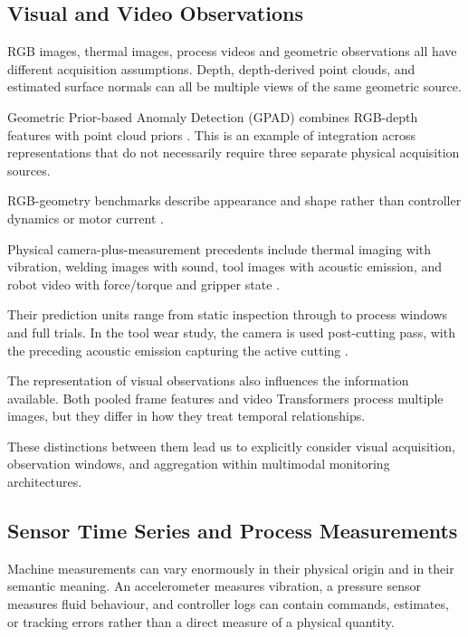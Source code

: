 \subsection{Visual and Video Observations}

RGB images, thermal images, process videos and geometric observations all have different acquisition
assumptions. Depth, depth-derived point clouds, and estimated surface normals can all be multiple
views of the same geometric source.

Geometric Prior-based Anomaly Detection (GPAD) combines RGB-depth features with point cloud priors \parencite[pp.~4--7]{P024}. This is an
example of integration across representations that do not necessarily require three separate
physical acquisition sources.

RGB-geometry benchmarks describe appearance and shape rather than controller dynamics or motor
current \parencite{Bergmann2022The,Bonfiglioli2023The}.

Physical camera-plus-measurement precedents include thermal imaging with vibration, welding images
with sound, tool images with acoustic emission, and robot video with force/torque and gripper state
\parencite{Huo2022Multisensor,Hua2026Weld,P045,Thoduka2024Handover}.

Their prediction units range from static inspection through to process windows and full trials. In
the tool wear study, the camera is used post-cutting pass, with the preceding acoustic emission
capturing the active cutting \parencite[pp.~19--22]{P045}.

The representation of visual observations also influences the information available. Both pooled
frame features and video Transformers process multiple images, but they differ in how they treat
temporal relationships.

These distinctions between them lead us to explicitly consider visual acquisition, observation
windows, and aggregation within multimodal monitoring architectures.

\subsection{Sensor Time Series and Process Measurements}

Machine measurements can vary enormously in their physical origin and in their semantic meaning. An
accelerometer measures vibration, a pressure sensor measures fluid behaviour, and controller logs
can contain commands, estimates, or tracking errors rather than a direct measure of a physical
quantity.

